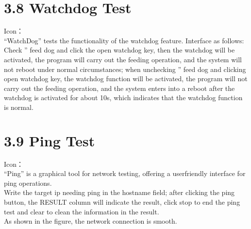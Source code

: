 \documentclass[letterpaper,10pt,openany,english]{sphinxmanual}
\begin{document}
\section{3.8 Watchdog Test}
\label{\detokenize{linux-manual:watchdog-test}}
\sphinxAtStartPar
Icon：\\
“WatchDog” tests the functionality of the watchdog feature. Interface as follows:\\
Check ” feed dog and click the open watchdog key, then the watchdog will be activated, the program will carry out the feeding operation, and the system will not reboot under normal circumstances; when unchecking ” feed dog and clicking open watchdog key, the watchdog function will be activated, the program will not carry out the feeding operation, and the system enters into a reboot after the watchdog is activated for about 10s, which indicates that the watchdog function is normal.


\section{3.9 Ping Test}
\label{\detokenize{linux-manual:ping-test}}
\sphinxAtStartPar
Icon：\\
“Ping” is a graphical tool for network testing, offering a user\sphinxhyphen{}friendly interface for ping operations.\\
Write the target ip needing ping in the hostname field;  after clicking the ping button, the RESULT column will indicate the result, click stop to end the ping test and clear to clean the information in the result.\\
As shown in the figure, the network connection is smooth.
\end{document}
